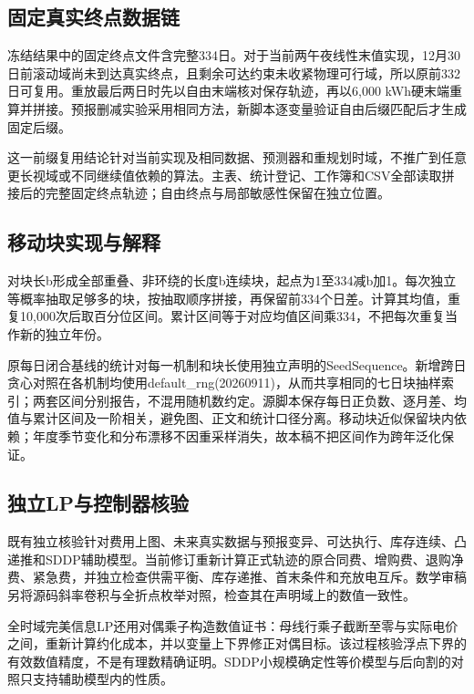 \subsection{固定真实终点数据链}
冻结结果中的固定终点文件含完整334日。对于当前两午夜线性末值实现，12月30日前滚动域尚未到达真实终点，且剩余可达约束未收紧物理可行域，所以原前332日可复用。重放最后两日时先以自由末端核对保存轨迹，再以6,000 kWh硬末端重算并拼接。预报删减实验采用相同方法，新脚本逐变量验证自由后缀匹配后才生成固定后缀。

这一前缀复用结论针对当前实现及相同数据、预测器和重规划时域，不推广到任意更长视域或不同继续值依赖的算法。主表、统计登记、工作簿和CSV全部读取拼接后的完整固定终点轨迹；自由终点与局部敏感性保留在独立位置。

\subsection{移动块实现与解释}
对块长b形成全部重叠、非环绕的长度b连续块，起点为1至334减b加1。每次独立等概率抽取足够多的块，按抽取顺序拼接，再保留前334个日差。计算其均值，重复10,000次后取百分位区间。累计区间等于对应均值区间乘334，不把每次重复当作新的独立年份。

原每日闭合基线的统计对每一机制和块长使用独立声明的SeedSequence。新增跨日贪心对照在各机制均使用default\_rng(20260911)，从而共享相同的七日块抽样索引；两套区间分别报告，不混用随机数约定。源脚本保存每日正负数、逐月差、均值与累计区间及一阶相关，避免图、正文和统计口径分离。移动块近似保留块内依赖；年度季节变化和分布漂移不因重采样消失，故本稿不把区间作为跨年泛化保证。




\subsection{独立LP与控制器核验}
既有独立核验针对费用上图、未来真实数据与预报变异、可达执行、库存连续、凸递推和SDDP辅助模型。当前修订重新计算正式轨迹的原合同费、增购费、退购净费、紧急费，并独立检查供需平衡、库存递推、首末条件和充放电互斥。数学审稿另将源码斜率卷积与全折点枚举对照，检查其在声明域上的数值一致性。

全时域完美信息LP还用对偶乘子构造数值证书：母线行乘子截断至零与实际电价之间，重新计算约化成本，并以变量上下界修正对偶目标。该过程核验浮点下界的有效数值精度，不是有理数精确证明。SDDP小规模确定性等价模型与后向割的对照只支持辅助模型内的性质。

\clearpage
